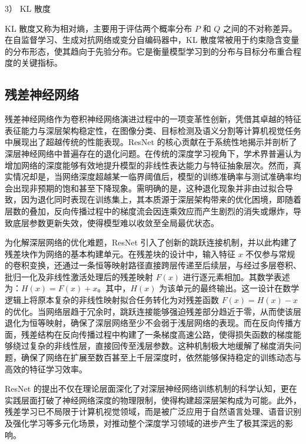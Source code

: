 3） KL 散度

KL 散度又称为相对熵，主要用于评估两个概率分布 $P$ 和 $Q$ 之间的不对称差异。在自监督学习、生成对抗网络或变分自编码器中，KL 散度常被用于约束隐含变量的分布形态，使其趋向于先验分布。它是衡量模型学习到的分布与目标分布重合程度的关键指标。

\subsection{残差神经网络}
残差神经网络作为卷积神经网络演进过程中的一项变革性创新，凭借其卓越的特征表征能力与深层架构稳定性，在图像分类、目标检测及语义分割等计算机视觉任务中展现出了超越传统的性能表现\cite{he2016deep}。ResNet 的核心贡献在于系统性地揭示并剖析了深层神经网络中普遍存在的退化问题。在传统的深度学习视角下，学术界普遍认为增加网络的深度能够有效地提升模型的非线性表达能力与特征抽象层次。然而，真实情况却是，当网络深度超越某一临界阈值后，模型的训练准确率与测试准确率均会出现非预期的饱和甚至下降现象。需明确的是，这种退化现象并非由过拟合导致，因为退化同时表现在训练集上，其本质源于深层架构带来的优化困境，即随着层数的叠加，反向传播过程中的梯度流会因连乘效应而产生剧烈的消失或爆炸，导致底层参数更新失效，使得模型难以收敛至全局最优状态。

为化解深层网络的优化难题，ResNet 引入了创新的跳跃连接机制，并以此构建了残差块作为网络的基本构建单元。在残差块的设计中，输入特征 $x$ 不仅参与常规的卷积变换，还通过一条恒等映射路径直接跨层传递至后续层，与经过多层卷积、批归一化及非线性激活处理后的残差映射 $F(x)$ 进行逐元素相加。其数学表述为：$H(x) = F(x) + x$。其中，$H(x)$ 为该单元的最终输出。这一设计在数学逻辑上将原本复杂的非线性映射拟合任务转化为对残差函数 $F(x) = H(x) - x$ 的优化。当网络层趋于冗余时，跳跃连接能够强迫残差部分趋近于零，从而使该层退化为恒等映射，确保了深层网络至少不会弱于浅层网络的表现。而在反向传播方面，残差结构在反向传播过程中构建了一条梯度高速公路，使得损失函数的梯度能够绕过复杂的非线性层，直接回传至浅层参数。这种机制极大地缓解了梯度消失问题，确保了网络在扩展至数百甚至上千层深度时，依然能够保持稳定的训练动态与高效的特征学习效率。

ResNet 的提出不仅在理论层面深化了对深层神经网络训练机制的科学认知，更在实践层面打破了神经网络深度的物理限制，使得构建超深层架构成为可能。此外，残差学习已不局限于计算机视觉领域，而是被广泛应用于自然语言处理、语音识别及强化学习等多元化场景，对推动整个深度学习领域的进步产生了极其深远的影响。

